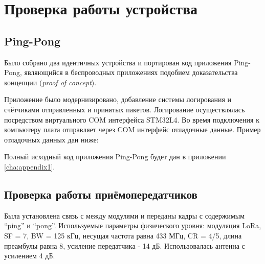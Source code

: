 \chapter{Проверка работы устройства}
\label{cha:pract}

\section{Ping-Pong}

Было собрано два идентичных устройства и портирован код приложения Ping-Pong, 
являющийся в беспроводных приложениях подобием доказательства концепции 
(\textit{proof of concept}).

Приложение было модернизировано, добавление системы логирования и счётчиками 
отправленных и принятых пакетов.
Логирование осуществлялась посредством виртуального COM интерфейса STM32L4.
Во время подключения к компьютеру плата отправляет через COM интерфейс 
отладочные данные. 
Пример отладочных данных дан ниже:

Полный исходный код приложения Ping-Pong будет дан в приложении 
\ref{cha:appendix1}.

\section{Проверка работы приёмопередатчиков}

Была установлена связь с между модулями и переданы кадры с содержимым
``ping'' и ``pong''.
Используемые параметры физического уровня: модуляция LoRa, SF = 7, BW = 125 
кГц, несущая частота равна 433 МГц, CR = 4/5, длина преамбулы равна 8, усиление 
передатчика - 14 дБ.
Использовалась антенна с усилением 4 дБ.



